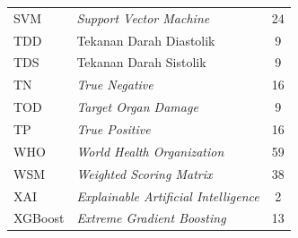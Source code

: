 \begin{longtable}{@{} l >{\raggedright\arraybackslash}p{7.5cm} c @{}}
SVM & \textit{Support Vector Machine} & 24 \\
TDD & Tekanan Darah Diastolik & 9 \\
TDS & Tekanan Darah Sistolik & 9 \\
TN & \textit{True Negative} & 16 \\
TOD & \textit{Target Organ Damage} & 9 \\
TP & \textit{True Positive} & 16 \\
WHO & \textit{World Health Organization} & 59 \\
WSM & \textit{Weighted Scoring Matrix} & 38 \\
XAI & \textit{Explainable Artificial Intelligence} & 2 \\
XGBoost & \textit{Extreme Gradient Boosting} & 13 \\


\end{longtable}

